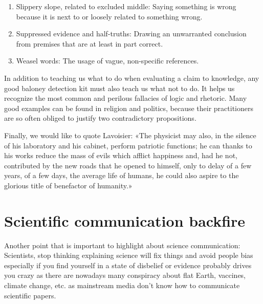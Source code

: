\begin{enumerate}
		\item Slippery slope, related to excluded middle: Saying something is wrong because it is next to or loosely related to something wrong.

		\item Suppressed evidence and half-truths: Drawing an unwarranted conclusion from premises that are at least in part correct.

		\item Weasel words: The usage of vague, non-specific references.
	\end{enumerate}
	
	In addition to teaching us what to do when evaluating a claim to knowledge, any good baloney detection kit must also teach us what not to do. It helps us recognize the most common and perilous fallacies of logic and rhetoric. Many good examples can be found in religion and politics, because their practitioners are so often obliged to justify two contradictory propositions.


	Finally, we would like to quote Lavoisier: «The physicist may also, in the silence of his laboratory and his cabinet, perform patriotic functions; he can thanks to his works reduce the mass of evils which afflict happiness and, had he not, contributed by the new roads that he opened to himself, only to delay of a few years, of a few days, the average life of humans, he could also aspire to the glorious title of benefactor of humanity.»
	
	\pagebreak
	\section{Scientific communication backfire}
	Another point that is important to highlight about science communication: Scientists, stop thinking explaining science will fix things and avoid people bias especially if you find yourself in a state of disbelief or evidence probably drives you crazy as there are nowadays many conspiracy about flat Earth, vaccines, climate change, etc. as mainstream media don't know how to communicate scientific papers.

